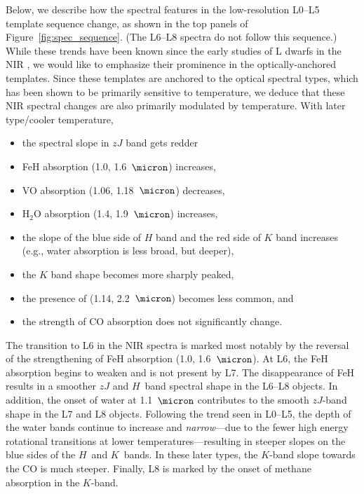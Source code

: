 \documentclass[12pt]{aastex6}
\begin{document}
Below, we describe how the spectral features in the low-resolution L0--L5 template sequence change, as shown in the top panels of Figure~\ref{fig:spec_sequence}. (The L6--L8 spectra do not follow this sequence.)
While these trends have been known since the early studies of L dwarfs in the NIR \citep{Testi01,Reid01_NIR,Geballe02}, we would like to emphasize their prominence in the optically-anchored templates.
Since these templates are anchored to the optical spectral types, which has been shown to be primarily sensitive to temperature, we deduce that these NIR spectral changes are also primarily modulated by temperature.
With later type/cooler temperature,
\begin{itemize}
\item the spectral slope in $zJ$ band gets redder
\item FeH absorption (1.0, 1.6~$\micron$) increases,
\item VO absorption (1.06, 1.18~$\micron$) decreases,
\item H$_2$O absorption (1.4, 1.9~$\micron$) increases,
\item the slope of the blue side of $H$ band and the red side of $K$ band increases (e.g., water absorption is less broad, but deeper),
\item the $K$ band shape becomes more sharply peaked,
\item the presence of  (1.14, 2.2~$\micron$) becomes less common, and
\item the strength of CO absorption does not significantly change.
\end{itemize}

The transition to L6 in the NIR spectra is marked most notably by the reversal of the strengthening of FeH absorption (1.0, 1.6~$\micron$).
At L6, the FeH absorption begins to weaken and is not present by L7.
The disappearance of FeH results in a smoother $zJ$ and $H$~band spectral shape in the L6--L8 objects.
In addition, the onset of water at 1.1~$\micron$ contributes to the smooth $zJ$-band shape in the L7 and L8 objects.
Following the trend seen in L0--L5, the depth of the water bands continue to increase and \emph{narrow}---due to the fewer high energy rotational transitions at lower temperatures---resulting in steeper slopes on the blue sides of the $H$~and $K$~bands.
In these later types, the $K$-band slope towards the CO is much steeper.
Finally, L8 is marked by the onset of methane absorption in the $K$-band.
\end{document}
